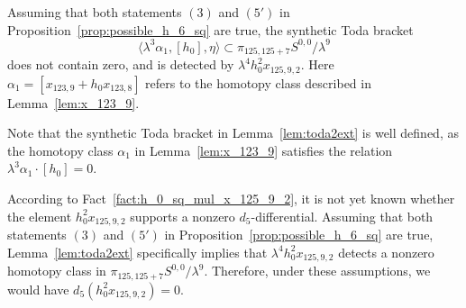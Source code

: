 \documentclass{amsart}
\numberwithin{equation}{section}
\begin{document}
\begin{lemma} \label{lem:toda2ext}
    Assuming that both statements $(3)$ and $(5')$ in Proposition~\ref{prop:possible_h_6_sq} are true, the synthetic Toda bracket
$$\langle \lambda^3 \alpha_1, [h_0], \eta \rangle \subset \pi_{125,125+7} S^{0,0}/\lambda^9$$
    does not contain zero, and is detected by $\lambda^4 h_0^2x_{125,9,2}$. Here $\alpha_1 = [x_{123,9}+h_0x_{123,8}]$ refers to the homotopy class described in Lemma~\ref{lem:x_123_9}.
\end{lemma}

Note that the synthetic Toda bracket in Lemma~\ref{lem:toda2ext} is well defined, as the homotopy class $\alpha_1$ in Lemma~\ref{lem:x_123_9} satisfies the relation $\lambda^3 \alpha_1 \cdot [h_0] = 0$.

\begin{remark} \label{rem:h_0_sq_mul_x_125_9_2}\label{rem:h02x1259}
    According to Fact~\ref{fact:h_0_sq_mul_x_125_9_2}, it is not yet known whether the element $h_0^2x_{125,9,2}$ supports a nonzero $d_5$-differential. Assuming that both statements $(3)$ and $(5')$ in Proposition~\ref{prop:possible_h_6_sq} are true, Lemma~\ref{lem:toda2ext} specifically implies that $\lambda^4 h_0^2x_{125,9,2}$ detects a nonzero homotopy class in $\pi_{125,125+7} S^{0,0}/\lambda^9$. Therefore, under these assumptions, we would have $d_5(h_0^2x_{125,9,2}) = 0$. 
\end{remark}
\end{document}
